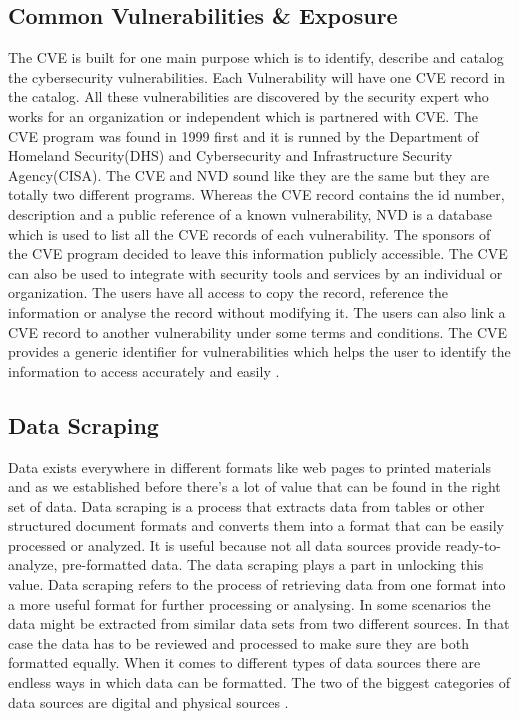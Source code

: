 \subsection{Common Vulnerabilities \& Exposure}
The \acs{CVE} is built for one main purpose which is to identify, describe and catalog the cybersecurity vulnerabilities. Each Vulnerability will have one \acs{CVE} record in the catalog. All these vulnerabilities are discovered by the security expert  who works for an organization or independent which is partnered with \acs{CVE}. The \acs{CVE} program was found in 1999 first and it is runned by the Department of Homeland Security(DHS) and Cybersecurity and Infrastructure Security Agency(CISA). The \acs{CVE} and \acs{NVD} sound like they are the same but they are totally two different programs. Whereas the \acs{CVE} record contains the id number, description and a public reference of a known vulnerability, \acs{NVD} is a database which is used to list all the \acs{CVE} records of each vulnerability. The sponsors of the \acs{CVE} program decided to leave this information publicly accessible. The \acs{CVE} can also be used to integrate with security tools and services by an individual or organization. The users have all access to copy the record, reference the information or analyse the record without modifying it. The users can also link a \acs{CVE} record to another vulnerability under some terms and conditions. The \acs{CVE} provides a generic identifier for vulnerabilities  which helps the user to identify the information to access accurately and easily \cite{cve}. 
%

\subsection{Data Scraping}
Data exists everywhere in different formats like web pages to printed materials and as we established before there’s a lot of value that can be found in the right set of data. Data scraping is a process that extracts data from tables or other structured document formats and converts them into a format that can be easily processed or analyzed. It is useful because not all data sources provide ready-to-analyze, pre-formatted data. The data scraping plays a part in unlocking this value. Data scraping refers to the process of retrieving data from one format into a more useful format for further processing or analysing. In some scenarios the data might be extracted from similar data sets from two different sources. In that case the data has to be reviewed and processed to make sure they are both formatted equally. When it comes to different types of data sources there are endless ways in which data can be formatted. The two of the biggest categories of data sources are digital and physical sources \cite{NaJaMa2018}.

